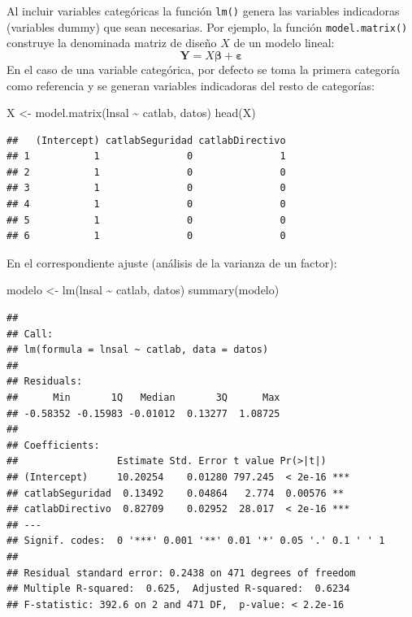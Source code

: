 \documentclass[
]{book}
\newenvironment{Shaded}{\begin{snugshade}}{\end{snugshade}}
\newcommand{\FunctionTok}[1]{\textcolor[rgb]{0.00,0.00,0.00}{#1}}
\newcommand{\NormalTok}[1]{#1}
\newcommand{\OtherTok}[1]{\textcolor[rgb]{0.56,0.35,0.01}{#1}}
\newcommand{\SpecialCharTok}[1]{\textcolor[rgb]{0.00,0.00,0.00}{#1}}
\theoremstyle{break}
\begin{document}
Al incluir variables categóricas la función \texttt{lm()} genera las variables indicadoras (variables dummy) que sean necesarias.
Por ejemplo, la función \texttt{model.matrix()} construye la denominada matriz de diseño \(X\) de un modelo lineal:
\[\mathbf{Y}=X\mathbf{\beta}+\mathbf{\varepsilon}\]
En el caso de una variable categórica, por defecto se toma la primera categoría como referencia y se generan variables indicadoras del resto de categorías:

\begin{Shaded}
\begin{Highlighting}[]
\NormalTok{X }\OtherTok{\textless{}{-}} \FunctionTok{model.matrix}\NormalTok{(lnsal }\SpecialCharTok{\textasciitilde{}}\NormalTok{ catlab, datos)}
\FunctionTok{head}\NormalTok{(X)}
\end{Highlighting}
\end{Shaded}

\begin{verbatim}
##   (Intercept) catlabSeguridad catlabDirectivo
## 1           1               0               1
## 2           1               0               0
## 3           1               0               0
## 4           1               0               0
## 5           1               0               0
## 6           1               0               0
\end{verbatim}

En el correspondiente ajuste (análisis de la varianza de un factor):

\begin{Shaded}
\begin{Highlighting}[]
\NormalTok{modelo }\OtherTok{\textless{}{-}} \FunctionTok{lm}\NormalTok{(lnsal }\SpecialCharTok{\textasciitilde{}}\NormalTok{ catlab, datos)}
\FunctionTok{summary}\NormalTok{(modelo)}
\end{Highlighting}
\end{Shaded}

\begin{verbatim}
## 
## Call:
## lm(formula = lnsal ~ catlab, data = datos)
## 
## Residuals:
##      Min       1Q   Median       3Q      Max 
## -0.58352 -0.15983 -0.01012  0.13277  1.08725 
## 
## Coefficients:
##                 Estimate Std. Error t value Pr(>|t|)    
## (Intercept)     10.20254    0.01280 797.245  < 2e-16 ***
## catlabSeguridad  0.13492    0.04864   2.774  0.00576 ** 
## catlabDirectivo  0.82709    0.02952  28.017  < 2e-16 ***
## ---
## Signif. codes:  0 '***' 0.001 '**' 0.01 '*' 0.05 '.' 0.1 ' ' 1
## 
## Residual standard error: 0.2438 on 471 degrees of freedom
## Multiple R-squared:  0.625,  Adjusted R-squared:  0.6234 
## F-statistic: 392.6 on 2 and 471 DF,  p-value: < 2.2e-16
\end{verbatim}
\end{document}
